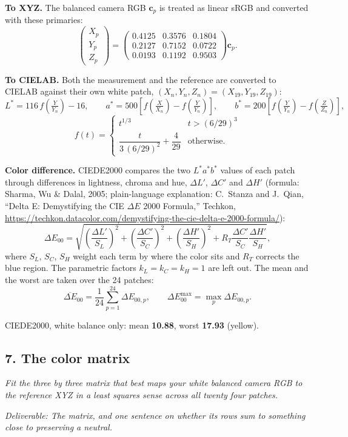 \documentclass[11pt]{article}
\newcommand{\task}[3]{\subsection*{#1}{\sloppy\noindent\textit{#2}\par}\smallskip\noindent\textit{Deliverable: #3}\par\medskip}
\begin{document}
\noindent\textbf{To XYZ.} The balanced camera RGB $\mathbf{c}_p$ is treated as linear sRGB and converted with these primaries:
\[
\begin{pmatrix} X_p \\ Y_p \\ Z_p \end{pmatrix} =
\begin{pmatrix} 0.4125 & 0.3576 & 0.1804 \\ 0.2127 & 0.7152 & 0.0722 \\ 0.0193 & 0.1192 & 0.9503 \end{pmatrix}
\mathbf{c}_p .
\]

\noindent\textbf{To CIELAB.} Both the measurement and the reference are converted to CIELAB against their own white patch, $(X_n, Y_n, Z_n) = (X_{19}, Y_{19}, Z_{19})$:
\[
L^* = 116\, f\!\left(\tfrac{Y}{Y_n}\right) - 16, \qquad
a^* = 500\left[f\!\left(\tfrac{X}{X_n}\right) - f\!\left(\tfrac{Y}{Y_n}\right)\right], \qquad
b^* = 200\left[f\!\left(\tfrac{Y}{Y_n}\right) - f\!\left(\tfrac{Z}{Z_n}\right)\right],
\]
\[
f(t) = \begin{cases} t^{1/3} & t > (6/29)^3 \\[2pt] \dfrac{t}{3\,(6/29)^2} + \dfrac{4}{29} & \text{otherwise.} \end{cases}
\]

\noindent\textbf{Color difference.} CIEDE2000 compares the two $L^*a^*b^*$ values of each patch through differences in lightness, chroma and hue, $\Delta L'$, $\Delta C'$ and $\Delta H'$ (formula: Sharma, Wu \& Dalal, 2005; plain-language explanation: C.~Stanza and J.~Qian, ``Delta E: Demystifying the CIE $\Delta E$ 2000 Formula,'' Techkon, \url{https://techkon.datacolor.com/demystifying-the-cie-delta-e-2000-formula/}):
\[
\Delta E_{00} = \sqrt{\left(\frac{\Delta L'}{S_L}\right)^2 + \left(\frac{\Delta C'}{S_C}\right)^2 + \left(\frac{\Delta H'}{S_H}\right)^2 + R_T \frac{\Delta C'}{S_C}\frac{\Delta H'}{S_H}},
\]
where $S_L$, $S_C$, $S_H$ weight each term by where the color sits and $R_T$ corrects the blue region. The parametric factors $k_L = k_C = k_H = 1$ are left out. The mean and the worst are taken over the 24 patches:
\[
\overline{\Delta E}_{00} = \frac{1}{24}\sum_{p=1}^{24} \Delta E_{00,p}, \qquad
\Delta E_{00}^{\max} = \max_p \Delta E_{00,p}.
\]

\noindent CIEDE2000, white balance only: mean \textbf{10.88}, worst \textbf{17.93} (yellow).

\task{7. The color matrix}
{Fit the three by three matrix that best maps your white balanced camera RGB to the reference XYZ in a least squares sense across all twenty four patches.}
{The matrix, and one sentence on whether its rows sum to something close to preserving a neutral.}
\end{document}
